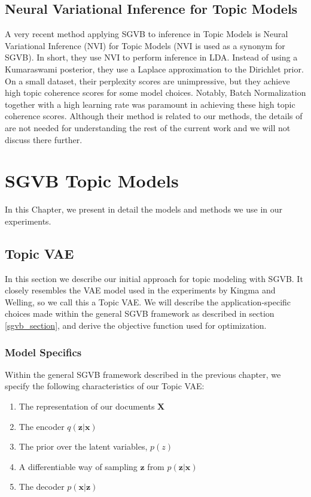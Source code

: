 \documentclass{report}
\begin{document}
\section{Neural Variational Inference for Topic Models}\label{NVItopic}
A very recent method applying SGVB to inference in Topic Models is Neural Variational Inference (NVI) for Topic Models \cite{srivastava2017neural} (NVI is used as a synonym for SGVB). In short, they use NVI to perform inference in LDA. Instead of using a Kumaraswami posterior, they use a Laplace approximation to the Dirichlet prior. On a small dataset, their perplexity scores are unimpressive, but they achieve high topic coherence scores for some model choices. Notably, Batch Normalization together with a high learning rate was paramount in achieving these high topic coherence scores. Although their method is related to our methods, the details of \cite{srivastava2017neural} are not needed for understanding the rest of the current work and we will not discuss there further.

\chapter{SGVB Topic Models}\label{models}
In this Chapter, we present in detail the models and methods we use in our experiments. 

\section{Topic VAE}\label{TopicVAE}

In this section we describe our initial approach for topic modeling with SGVB. It closely resembles the VAE model used in the experiments by Kingma and Welling\cite{kingma2013auto}, so we call this a Topic VAE. We will describe the application-specific choices made within the general SGVB framework as described in section \ref{sgvb_section}, and derive the objective function used for optimization. 

\subsection{Model Specifics}

Within the general SGVB framework described in the previous chapter, we specify the following characteristics of our Topic VAE:

\begin{enumerate}
	\item The representation of our documents $\mathbf{X}$
	\item The encoder $q(\mathbf{z}|\mathbf{x})$
	\item The prior  over the latent variables, $p(z)$
	\item A differentiable way of sampling $\mathbf{z}$ from $p(\mathbf{z}|\mathbf{x})$ 
	\item The decoder $p(\mathbf{x}|\mathbf{z})$
\end{enumerate}
\end{document}
